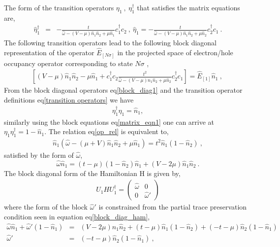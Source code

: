 \documentclass[12pt,a4paper]{article}
\begin{document}
The form of the transition operators $\eta_{1}~,~ \eta^{\dagger}_{1}$ that satisfies the matrix equations are, 
\begin{eqnarray}
\hat{\eta}^{\dagger}_{1} &=& -\frac{t}{\hat{\omega}-(V-\mu)\hat{n}_{1}\hat{n}_{2}+\mu\hat{n}_{1}}c^{\dagger}_{1}c_{2}~,~\hat{\eta}_{1} = -\frac{t}{\hat{\omega}-(V-\mu)\hat{n}_{1}\hat{n}_{2}+\mu\hat{n}_{2}}c^{\dagger}_{2}c_{1}~.\label{transition operators}
\end{eqnarray}
The following transition operators lead to the following block diagonal representation of the operator $\hat{E}_{[N\sigma]}$ in the projected space of electron/hole occupancy operator corresponding to state $N\sigma$ ,
\begin{eqnarray}
\left[(V-\mu)\hat{n}_{1}\hat{n}_{2}-\mu\hat{n}_{1} +c^{\dagger}_{1}c_{2}\frac{t^{2}}{\hat{\omega}-(V-\mu)\hat{n}_{1}\hat{n}_{2}+\mu\hat{n}_{2}}c^{\dagger}_{2}c_{1}\right] = \hat{E}_{[1]}\hat{n}_{1}~,~
\label{block_diag1}
\end{eqnarray}
From the block diagonal operators eq\eqref{block_diag1} and the transition operator definitions  eq\eqref{transition operators} we have 
\begin{eqnarray}
\eta^{\dagger}_{1}\eta_{1}=\hat{n}_{1},\label{op_rel}
\end{eqnarray}
similarly using the block equations eq\eqref{matrix_eqn1} one can arrive at $\eta_{1}\eta^{\dagger}_{1}=1-\hat{n}_{1}$. The relation eq\eqref{op_rel} is equivalent to,
\begin{eqnarray}
\hat{n}_{1}(\hat{\omega} -(\mu+V)\hat{n}_{1}\hat{n}_{2}+\mu\hat{n}_{1})= t^{2}\hat{n}_{1}(1-\hat{n}_{2})~,
\end{eqnarray}
satisfied by the form of $\hat{\omega}$,
\begin{equation}
\hat{\omega}\hat{n}_{1} = (t-\mu)(1-\hat{n}_{2})\hat{n}_{1}+(V-2\mu)\hat{n}_{1}\hat{n}_{2}~.
\end{equation}
The block diagonal form of the Hamiltonian H is given by,
\begin{eqnarray}
U_{1}HU^{\dagger}_{1} =\begin{pmatrix}
\hat{\omega} & 0\\
0 & \hat{\omega}'
\end{pmatrix}
\end{eqnarray}
where the form of the block $\hat{\omega}'$ is constrained from the partial trace preservation condition seen in equation eq\eqref{block_diag_ham},
\begin{eqnarray}
 \hat{\omega}\hat{n}_{1} + \hat{\omega}'(1-\hat{n}_{1}) &=& (V-2\mu)\hat{n}_{1}\hat{n}_{2} + (t-\mu)\hat{n}_{1}(1-\hat{n}_{2})+(-t-\mu)\hat{n}_{2}(1-\hat{n}_{1})\nonumber\\
 \hat{\omega}'&=& (-t-\mu)\hat{n}_{2}(1-\hat{n}_{1})~,
\end{eqnarray}
\end{document}
